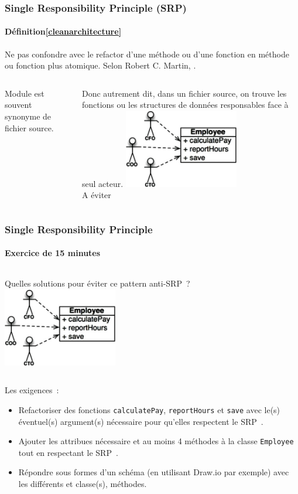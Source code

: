 \documentclass{beamer}
\begin{document}
    \begin{frame}
        \transdissolve
        \frametitle{Single Responsibility Principle (SRP)}
        \framesubtitle{Définition\cref{cleanarchitecture}}
        Ne pas confondre avec le refactor d'une méthode ou d'une fonction en méthode ou fonction plus atomique.
        \bigbreak
        Selon Robert C. Martin, .
        \begin{columns}
            Module est souvent synonyme de fichier source.

            Donc autrement dit, dans un fichier source, on trouve les fonctions ou les structures de données responsables face à seul acteur.
            \centering
            \includegraphics[width=5cm]{image/s-to-avoid} \\ A éviter \\
        \end{columns}
    \end{frame}

    \begin{frame}
        \transdissolve
        \frametitle{Single Responsibility Principle}
        \framesubtitle{Exercice \execcounterdispinc{} de 15 minutes}
        \begin{columns}
            Quelles solutions pour éviter ce pattern anti-SRP~?
            \bigbreak
            \centering
            \includegraphics[width=5cm]{image/s-to-avoid}
        \end{columns}
        \flushleft
        Les exigences~:
        \begin{itemize}
            \item Refactoriser des fonctions \lstinline{calculatePay}, \lstinline{reportHours} et \lstinline{save} avec le(s) éventuel(s) argument(s) nécessaire pour qu'elles respectent le SRP~.
            \item Ajouter les attribues nécessaire et au moins 4 méthodes à la classe \lstinline{Employee} tout en respectant le SRP~.
            \item Répondre sous formes d'un schéma (en utilisant Draw.io par exemple) avec les différents et classe(s), méthodes.
        \end{itemize}
    \end{frame}
\end{document}
